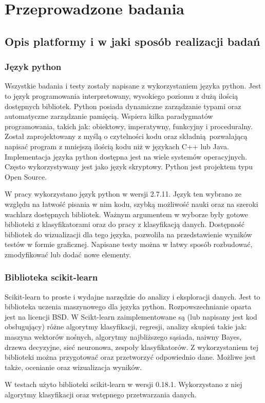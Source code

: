 \chapter{Przeprowadzone badania}

\section{Opis platformy i w jaki sposób realizacji badań}

\subsection{Język python}
Wszystkie badania i testy zostały napisane z wykorzystaniem języka python. Jest to język programowania interpretowany, wysokiego poziomu z dużą ilością dostępnych bibliotek. Python\cite{python} posiada dynamiczne zarządzanie typami oraz automatyczne zarządzanie pamięcią. Wspiera kilka paradygmatów programowania, takich jak: obiektowy, imperatywny, funkcyjny i proceduralny. Został zaprojektowany z myślą o czytelności kodu oraz składnią pozwalającą napisać program z mniejszą ilością kodu niż w językach C++ lub Java. Implementacja języka python dostępna jest na wiele systemów operacyjnych. Często wykorzystywany jest jako język skryptowy. Python jest projektem typu Open Source. \par
W pracy wykorzystano język python w wersji 2.7.11. Język ten wybrano ze względu na łatwość pisania w nim kodu, szybką możliwość nauki oraz na szeroki wachlarz dostępnych bibliotek. Ważnym argumentem w wyborze były gotowe biblioteki z klasyfikatorami oraz do pracy z klasyfikacją danych. Dostępność bibliotek do wizualizacji dla tego języka, pozwoliła na przedstawienie wyników testów w formie graficznej. Napisane testy można w łatwy sposób rozbudować, zmodyfikować lub dodać nowe elementy.    

\subsection{Biblioteka scikit-learn}
Scikit-learn\cite{scikit} to proste i wydajne narzędzie do analizy i eksploracji danych. Jest to biblioteka uczenia maszynowego dla języka python. Rozpowszechnianie oparta jest na licencji BSD. W Scikt-learn zaimplementowane są (lub napisany jest kod obsługujący) różne algorytmy klasyfikacji, regresji, analizy skupień takie jak: maszyna wektorów nośnych, algorytmy najbliższego sąsiada, naiwny Bayes, drzewa decyzyjne, sieć neuronowa, zespoły klasyfikatorów. Z wykorzystaniem tej biblioteki można przygotować oraz przetworzyć odpowiednio dane. Możliwe jest także, ocenianie oraz wizualizacja wyników. \par
W testach użyto biblioteki scikit-learn w wersji 0.18.1. Wykorzystano z niej algorytmy klasyfikacji oraz wstępnego przetwarzania danych.
